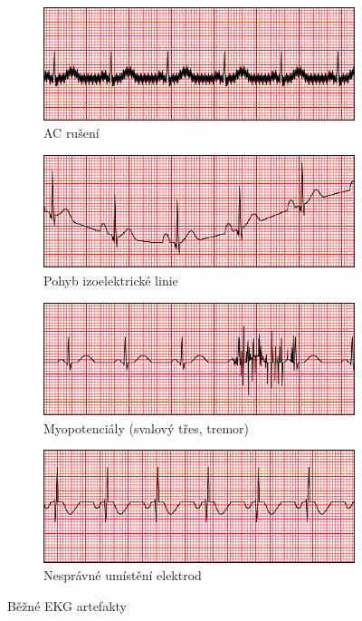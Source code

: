 \begin{figure}[h]
	\begin{subfigure}[b]{0.5\linewidth}
		\centering
		\includegraphics[width=0.8\linewidth]{../assets/ecg/ac_Interference}
		\caption{AC rušení}
		\label{fig:ac_Interference}
		\vspace{4ex}
	\end{subfigure}
	\begin{subfigure}[b]{0.5\linewidth}
		\centering
		\includegraphics[width=0.8\linewidth]{../assets/ecg/w_baseline}
		\caption{Pohyb izoelektrické linie}
		\label{fig:w_baseline}
		\vspace{4ex}
	\end{subfigure}
	\begin{subfigure}[b]{0.5\linewidth}
		\centering
		\includegraphics[width=0.8\linewidth]{../assets/ecg/muscle_tremor}
		\caption{Myopotenciály (svalový třes, tremor)}
		\label{fig:muscle_tremor}
	\end{subfigure}
	\begin{subfigure}[b]{0.5\linewidth}
		\centering
		\includegraphics[width=0.8\linewidth]{../assets/ecg/rev_electrodes}
		\caption{Nesprávné umístění elektrod}
		\label{fig:rev_electrodes}
	\end{subfigure}
	\caption{Běžné EKG artefakty~\cite{Mauvila2004}}
	\label{fig:common_artifacts}
\end{figure}

